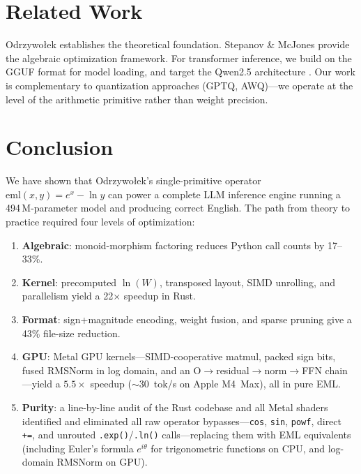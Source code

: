 \documentclass[acmsmall,nonacm]{acmart}
\begin{document}
\section{Related Work}
\label{sec:related}

Odrzywołek \cite{odrzywołek2026} establishes the theoretical foundation.
Stepanov \& McJones \cite{stepanov2009} provide the algebraic
optimization framework.  For transformer inference, we build on the GGUF
format \cite{gguf} for model loading, and target the Qwen2.5
architecture \cite{qwen2.5}.  Our work is complementary to quantization
approaches (GPTQ, AWQ)---we operate at the level of the arithmetic
primitive rather than weight precision.


\section{Conclusion}
\label{sec:conclusion}

We have shown that Odrzywołek's single-primitive operator
$\mathrm{eml}(x,y) = e^x - \ln y$ can power a complete LLM inference
engine running a 494\,M-parameter model and producing correct English.
The path from theory to practice required four levels of optimization:
\begin{enumerate}
\item \textbf{Algebraic}: monoid-morphism factoring reduces Python call
  counts by 17--33\%.
\item \textbf{Kernel}: precomputed $\ln(W)$, transposed layout, SIMD
  unrolling, and parallelism yield a 22$\times$ speedup in Rust.
\item \textbf{Format}: sign+magnitude encoding, weight fusion, and
  sparse pruning give a 43\% file-size reduction.
\item \textbf{GPU}: Metal GPU kernels---SIMD-cooperative matmul, packed
  sign bits, fused RMSNorm in log domain, and an
  O$\to$residual$\to$norm$\to$FFN chain---yield a $5.5\times$ speedup
  ($\sim$30~tok/s on Apple M4~Max), all in pure EML.
\item \textbf{Purity}: a line-by-line audit of the Rust codebase and
  all Metal shaders identified and eliminated all raw operator
  bypasses---\texttt{cos}, \texttt{sin}, \texttt{powf}, direct
  \texttt{+=}, and unrouted \texttt{.exp()}/\texttt{.ln()} calls---replacing
  them with EML equivalents (including Euler's formula
  $e^{i\theta}$ for trigonometric functions on CPU, and log-domain
  RMSNorm on GPU).
\end{enumerate}
\end{document}
